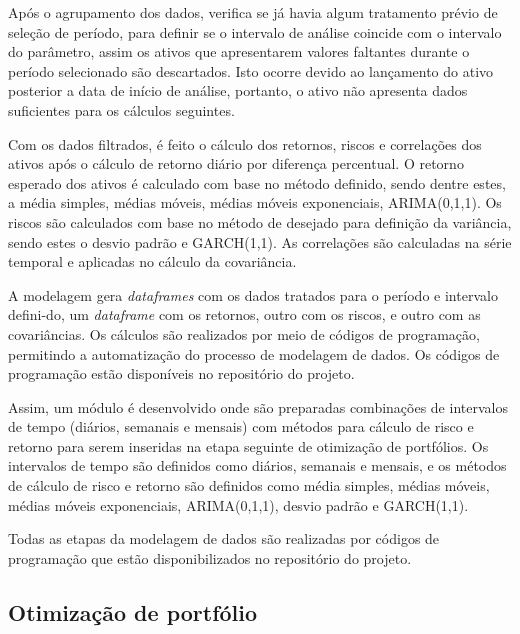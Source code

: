         \ipar Após o agrupamento dos dados, verifica se já havia algum tratamento prévio de seleção de período, para definir se o intervalo de análise coincide com o intervalo do parâmetro, assim os ativos que apresentarem valores faltantes durante o período selecionado são descartados. Isto ocorre devido ao lançamento do ativo posterior a data de início de análise, portanto, o ativo não apresenta dados suficientes para os cálculos seguintes.

        \ipar Com os dados filtrados, é feito o cálculo dos retornos, riscos e correlações dos ativos após o cálculo de retorno diário por diferença percentual. O retorno esperado dos ativos é calculado com base no método definido, sendo dentre estes, a média simples, médias móveis, médias móveis exponenciais, ARIMA(0,1,1). Os riscos são calculados com base no método de desejado para definição da variância, sendo estes o desvio padrão e GARCH(1,1). As correlações são calculadas na série temporal e aplicadas no cálculo da covariância.

        \ipar A modelagem gera \textit{dataframes} com os dados tratados para o período e intervalo defini-do, um \textit{dataframe} com os retornos, outro com os riscos, e outro com as covariâncias. Os cálculos são realizados por meio de códigos de programação, permitindo a automatização do processo de modelagem de dados. Os códigos de programação estão disponíveis no repositório do projeto.

        \ipar Assim, um módulo é desenvolvido onde são preparadas combinações de intervalos de tempo (diários, semanais e mensais) com métodos para cálculo de risco e retorno para serem inseridas na etapa seguinte de otimização de portfólios. Os intervalos de tempo são definidos como diários, semanais e mensais, e os métodos de cálculo de risco e retorno são definidos como média simples, médias móveis, médias móveis exponenciais, ARIMA(0,1,1), desvio padrão e GARCH(1,1).

        \ipar Todas as etapas da modelagem de dados são realizadas por códigos de programação que estão disponibilizados no repositório do projeto.

    \subsection{Otimização de portfólio}

